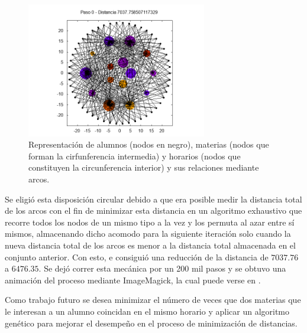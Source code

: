\documentclass{article}
\begin{document}
  \begin{figure}[h]
    \includegraphics[width=0.7\textwidth]{h000000}
    \centering
    \caption{Representación de alumnos (nodos en negro), materias (nodos que forman la cirfunferencia intermedia) y horarios (nodos que constituyen la circunferencia interior) y sus relaciones mediante arcos.}
    \label{fig:horarios}
  \end{figure}

  Se eligió esta disposición circular debido a que era posible medir la distancia total de los arcos con el fin de minimizar esta distancia en un algoritmo exhaustivo que recorre todos los nodos de un mismo tipo a la vez y los permuta al azar entre sí mismos, almacenando dicho acomodo para la siguiente iteración solo cuando la nueva distancia total de los arcos es menor a la distancia total almacenada en el conjunto anterior. Con esto, e consiguió una reducción de la distancia de $7037.76$ a $6476.35$. Se dejó correr esta mecánica por un 200 mil pasos y se obtuvo una animación del proceso mediante ImageMagick, la cual puede verse en .

  Como trabajo futuro se desea minimizar el número de veces que dos materias que le interesan a un alumno coincidan en el mismo horario y aplicar un algoritmo genético para mejorar el desempeño en el proceso de minimización de distancias.

  {}
  
\end{document}

